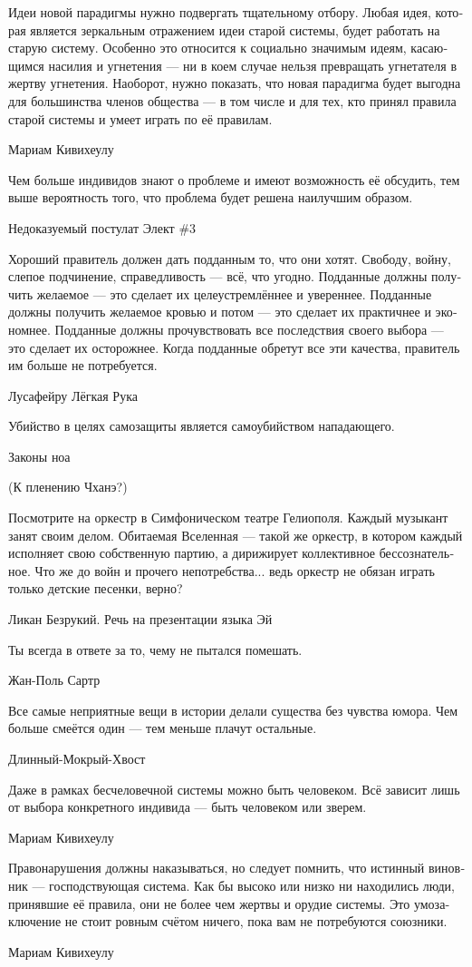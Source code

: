 \documentclass[a4paper,12pt,fleqn]{book}\usepackage{polyglossia}\setdefaultlanguage[babelshorthands=true]{russian}\setotherlanguage{english}\defaultfontfeatures{Ligatures=TeX,Mapping=tex-text}\usepackage{xcolor}\newcommand{\ml}[3]{#2}
\begin{document}
{\epigraph
{Идеи новой парадигмы нужно подвергать тщательному отбору.
Любая идея, которая является зеркальным отражением идеи старой системы, будет работать на старую систему.
Особенно это относится к социально значимым идеям, касающимся насилия и угнетения --- ни в коем случае нельзя превращать угнетателя в жертву угнетения.
Наоборот, нужно показать, что новая парадигма будет выгодна для большинства членов общества --- в том числе и для тех, кто принял правила старой системы и умеет играть по её правилам.}
{Мариам Кивихеулу}

\epigraph
{Чем больше индивидов знают о проблеме и имеют возможность её обсудить, тем выше вероятность того, что проблема будет решена наилучшим образом.}
{Недоказуемый постулат Элект \#3}

\epigraph
{Хороший правитель должен дать подданным то, что они хотят.
Свободу, войну, слепое подчинение, справедливость --- всё, что угодно.
Подданные должны получить желаемое --- это сделает их целеустремлённее и увереннее.
Подданные должны получить желаемое кровью и потом --- это сделает их практичнее и экономнее.
Подданные должны прочувствовать все последствия своего выбора --- это сделает их осторожнее.
Когда подданные обретут все эти качества, правитель им больше не потребуется.}
{Лусафейру Лёгкая Рука}

\epigraph{
\ml{$0$}
{Убийство в целях самозащиты является самоубийством нападающего.}
{Justifiable homicide is assailant's suicide.}
}{Законы ноа}

(К пленению Чханэ?)

\epigraph
{Посмотрите на оркестр в Симфоническом театре Гелиополя.
Каждый музыкант занят своим делом.
Обитаемая Вселенная --- такой же оркестр, в котором каждый исполняет свою собственную партию, а дирижирует коллективное бессознательное.
Что же до войн и прочего непотребства... ведь оркестр не обязан играть только детские песенки, верно?}
{Ликан Безрукий.
Речь на презентации языка Эй}

\epigraph
{Ты всегда в ответе за то, чему не пытался помешать.}
{Жан-Поль Сартр}

\epigraph
{Все самые неприятные вещи в истории делали существа без чувства юмора.
Чем больше смеётся один --- тем меньше плачут остальные.}
{Длинный-Мокрый-Хвост}

\epigraph
{Даже в рамках бесчеловечной системы можно быть человеком.
Всё зависит лишь от выбора конкретного индивида --- быть человеком или зверем.}
{Мариам Кивихеулу}

\epigraph
{Правонарушения должны наказываться, но следует помнить, что истинный виновник --- господствующая система.
Как бы высоко или низко ни находились люди, принявшие её правила, они не более чем жертвы и орудие системы.
Это умозаключение не стоит ровным счётом ничего, пока вам не потребуются союзники.}
{Мариам Кивихеулу}

}
\end{document}
